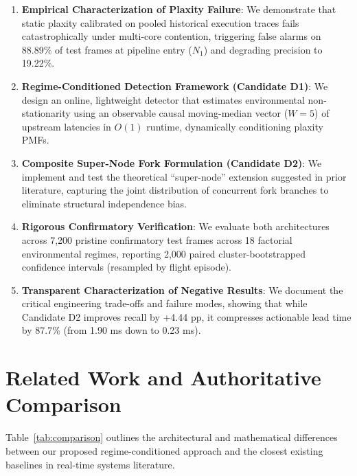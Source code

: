 \documentclass[conference]{IEEEtran}
\begin{document}
\begin{enumerate}
    \item \textbf{Empirical Characterization of Plaxity Failure}: We demonstrate that static plaxity calibrated on pooled historical execution traces fails catastrophically under multi-core contention, triggering false alarms on 88.89\% of test frames at pipeline entry ($N_1$) and degrading precision to 19.22\%.
    \item \textbf{Regime-Conditioned Detection Framework (Candidate D1)}: We design an online, lightweight detector that estimates environmental non-stationarity using an observable causal moving-median vector ($W=5$) of upstream latencies in $O(1)$ runtime, dynamically conditioning plaxity PMFs.
    \item \textbf{Composite Super-Node Fork Formulation (Candidate D2)}: We implement and test the theoretical ``super-node'' extension suggested in prior literature, capturing the joint distribution of concurrent fork branches to eliminate structural independence bias.
    \item \textbf{Rigorous Confirmatory Verification}: We evaluate both architectures across 7,200 pristine confirmatory test frames across 18 factorial environmental regimes, reporting 2,000 paired cluster-bootstrapped confidence intervals (resampled by flight episode).
    \item \textbf{Transparent Characterization of Negative Results}: We document the critical engineering trade-offs and failure modes, showing that while Candidate D2 improves recall by +4.44 pp, it compresses actionable lead time by 87.7\% (from 1.90 ms down to 0.23 ms).
\end{enumerate}

\section{Related Work and Authoritative Comparison}
Table~\ref{tab:comparison} outlines the architectural and mathematical differences between our proposed regime-conditioned approach and the closest existing baselines in real-time systems literature.
\end{document}
